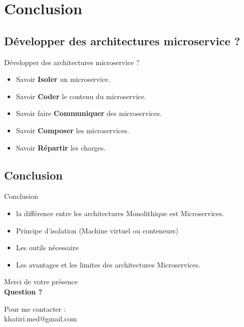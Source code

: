 \documentclass{beamer}
\begin{document}
\section{Conclusion}
\subsection{Développer des architectures microservice ?}
    \begin{frame}{Développer des architectures microservice ?}
        \begin{itemize} 
            \item Savoir \textbf{Isoler} un microservice.
            \item Savoir \textbf{Coder} le contenu du microservice.
            \item Savoir faire \textbf{Communiquer} des microservices.
            \item Savoir \textbf{Composer} les microservices.
            \item Savoir \textbf{Répartir} les charges.
        \end{itemize}

    \end{frame}
\subsection{Conclusion}
    \begin{frame}{Conclusion}
        \begin{itemize} 
            \item la différence entre les architectures  
                Monolithique est Microservices.
            \item Principe d'isolation (Machine virtuel ou conteneurs)
            \item Les outils nécessaire
            \item Les avantages et les limites des architectures Microservices.
        \end{itemize}

    \end{frame}
\begin{frame}
    \begin{center}
    Merci de votre présence\\
        \textbf{Question ?}


        Pour me contacter :\\
        \alert{khatiri.med@gmail.com}
    \end{center}
\end{frame}
\end{document}
